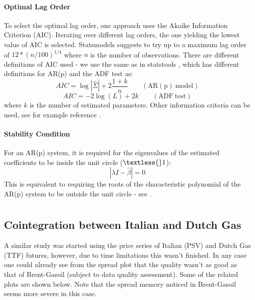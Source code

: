 \documentclass[11pt]{article}
\begin{document}
\begin{appendices}
    \subsubsection{Optimal Lag Order}\label{optimal-lag-order}
    
To select the optimal lag order, one approach uses the Akaike
Information Criterion (AIC). Iterating over different lag orders, the
one yielding the lowest value of AIC is selected. Statsmodels suggests to
try up to a maximum lag order of \(12*(n/100)^{1/4}\) where \(n\) is the
number of observations.
There are different definitions of AIC used - we use the same as in
statstools \cite{statstools},
which has different definitions for AR(p) and the ADF test as:
\begin{equation}
AIC = \log | \hat{\Sigma} |+ 2 \frac{1 + k}{n} \qquad \mathrm{(AR(p) \ model)}
\end{equation}
\begin{equation}
AIC = -2 \log(L) + 2k  \qquad \mathrm{(ADF \ test)} 
\end{equation}
where \(k\) is the number of estimated parameters. Other information
criteria can be used, see for example reference \cite{ref}.

    \subsubsection{Stability Condition}\label{stability-condition}
    
For an AR(p) system, it is required for the eigenvalues of the estimated coefficients to be inside the unit circle ($ \textless{} 1$): \begin{equation}
| \lambda I - \hat{\beta} | = 0
\end{equation} This is equivalent to requiring the roots of the characteristic
polynomial of the AR(p) system to be outside the unit circle - see
 \cite{ref}.

\chapter{} \label{appendixB}

\newpage 
    \section{Cointegration between Italian and Dutch Gas}\label{cointegration-between-italian-and-dutch-gas}
    
    A similar study was started using the price series of Italian (PSV) and Dutch Gas (TTF) futures, however, due to time limitations this wasn't finished. In any case one could already see from the spread plot that the quality wasn't as good as that of Brent-Gasoil (subject to data quality assessment). Some of the related plots are shown below. Note that the spread memory noticed in Brent-Gasoil seems more severe in this case.
    

\end{appendices}
\end{document}
